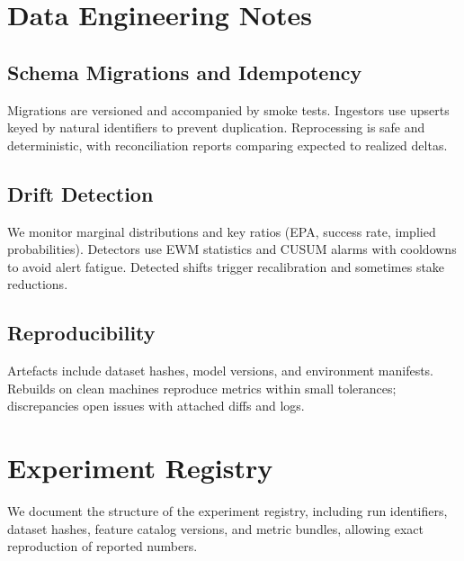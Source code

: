 \section{Data Engineering Notes}\label{app:data-eng}

\subsection{Schema Migrations and Idempotency}
Migrations are versioned and accompanied by smoke tests. Ingestors use upserts keyed by natural identifiers to prevent duplication. Reprocessing is safe and deterministic, with reconciliation reports comparing expected to realized deltas.

\subsection{Drift Detection}
We monitor marginal distributions and key ratios (EPA, success rate, implied probabilities). Detectors use EWM statistics and CUSUM alarms with cooldowns to avoid alert fatigue. Detected shifts trigger recalibration and sometimes stake reductions.

\subsection{Reproducibility}
Artefacts include dataset hashes, model versions, and environment manifests. Rebuilds on clean machines reproduce metrics within small tolerances; discrepancies open issues with attached diffs and logs.

\section{Experiment Registry}\label{app:experiment-registry}
We document the structure of the experiment registry, including run identifiers, dataset hashes, feature catalog versions, and metric bundles, allowing exact reproduction of reported numbers.

